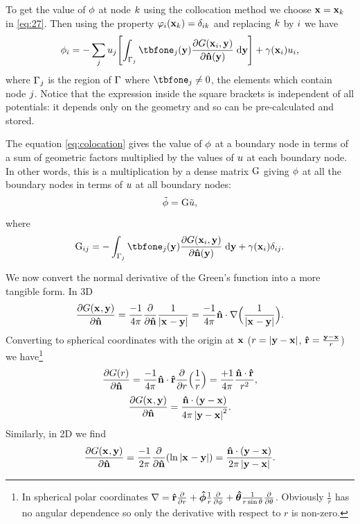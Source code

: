 To get the value of $\phi$ at node ${k}$ using the collocation method we choose $\boldsymbol{\mathrm{x}} = \boldsymbol{\mathrm{x}}_{k}$ in \cref{eq:27}.
Then using the property $\varphi_{i}(\boldsymbol{\mathrm{x}}_{k}) = \delta_{{i} {k}}$ and replacing ${k}$ by ${i}$ we have
\begin{equation}
  \phim_{\ibasis} =
  - \sum_\ibasisb \phione_{\ibasisb}  \bigs{\int_{\boundd_\ibasisb} \tbfone_{\ibasisb}(\yv)
  \pd{\Green[\ibasis]}{\nv(\yv)} \d \yv}
   + \gamma(\xv_\ibasis) \phione_{\ibasis},
  \label{eq:colocation}
\end{equation}
where ${{\Gamma}_{j}}$ is the region of ${\Gamma}$ where $\tbfone_{\ibasisb} \neq 0$, \ie the elements which contain node ${j}$.
Notice that the expression inside the square brackets is independent of all potentials: it depends only on the geometry and so can be pre-calculated and stored.


The equation \cref{eq:colocation} gives the value of $\phi$ at a boundary node in terms of a sum of geometric factors multiplied by the values of $u$ at each boundary node.
In other words, this is a multiplication by a dense matrix ${\mathbf{\mathrm{G}}}$ giving $\phi$ at all the boundary nodes in terms of $u$ at all boundary nodes:
\begin{equation}
  \label{eq:10}
  \phimdis = \bm \phionedis,
\end{equation}
where
\begin{equation}
  \label{eq:17}
  \bm_{\ibasis\ibasisb} = - \int_{\boundd_\ibasisb} \tbfone_{\ibasisb}(\yv) \pd{\Green[\ibasis]}{\nv(\yv)} \d \yv
   + \gamma(\xv_\ibasis)\delta_{\ibasis\ibasisb}.
\end{equation}

We now convert the normal derivative of the Green's function into a more tangible form.
In 3D
\begin{equation}
  \label{eq:11}
  \pd{\Green}{\nv} = \frac{-1}{4 \pi} \pd{}{\nv} \Gthreed = \frac{-1}{4 \pi} \nv \cdot \grad \Big( \Gthreed \Big).
\end{equation}
Converting to spherical coordinates with the origin at $\boldsymbol{\mathrm{x}}$ ($r = \left|{\boldsymbol{\mathrm{y}} - \boldsymbol{\mathrm{x}}} \right|$, $\boldsymbol{\mathrm{\hat{r}}} = \frac{\boldsymbol{\mathrm{y}} - \boldsymbol{\mathrm{x}}}{r}$) we have\footnote{In spherical polar coordinates $\nabla = \boldsymbol{\mathrm{\hat{r}}} \frac{\partial }{\partial r} +  \boldsymbol{\mathrm{\hat{\phi}}} \frac{1}{r} \frac{\partial }{\partial \phi} + \boldsymbol{\mathrm{\hat{\theta}}} \frac{1}{r \sin \theta} \frac{\partial }{\partial \theta}$.
Obviously $\frac{1}{r}$ has no angular dependence so only the derivative with respect to $r$ is non-zero.}
\begin{equation}
  \label{eq:12}
  \pd{G(r)}{\nv} = \frac{-1}{4 \pi} \nv \cdot \ruv \pd{}{r} \Big( \frac{1}{r} \Big)
  = \frac{+1}{4 \pi}  \frac{\nv \cdot \ruv}{r^2},
\end{equation}
\begin{equation}
  \label{eq:13}
  \pd{\Green}{\nv} = \frac{\nv \cdot (\yv - \xv)}{4 \pi \abs{\yv - \xv} ^2} .
\end{equation}
Similarly, in 2D we find
\begin{equation}
  \label{eq:14}
  \pd{\Green}{\nv} = \frac{-1}{2 \pi} \pd{}{\nv} (\Gtwod) = \frac{\nv \cdot (\yv - \xv)}{2 \pi \abs{\yv - \xv}}.
\end{equation}

